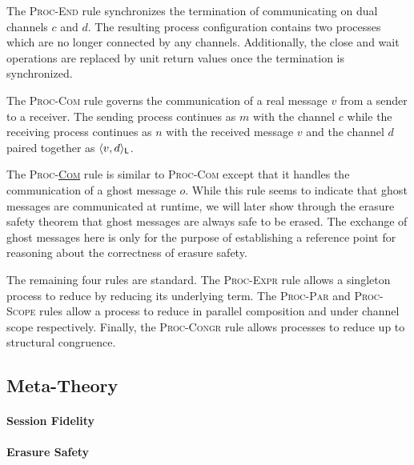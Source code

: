 The \textsc{Proc-End} rule synchronizes the termination of communicating on dual 
channels $c$ and $d$. The resulting process configuration contains two processes
which are no longer connected by any channels. Additionally, the close and wait 
operations are replaced by unit return values once the termination is synchronized.

The \textsc{Proc-Com} rule governs the communication of a real message $v$ from
a sender to a receiver. The sending process continues as $m$ with the channel
$c$ while the receiving process continues as $n$ with the received
message $v$ and the channel $d$ paired together as $\langle{{v},{d}}\rangle_{\textsf{L}}$.

The \textsc{Proc-\underline{Com}} rule is similar to \textsc{Proc-Com} except
that it handles the communication of a ghost message $o$. While this rule seems
to indicate that ghost messages are communicated at runtime, we will later show
through the erasure safety theorem that ghost messages are always safe to be erased.
The exchange of ghost messages here is only for the purpose of establishing a 
reference point for reasoning about the correctness of erasure safety.

The remaining four rules are standard. The \textsc{Proc-Expr} rule allows a
singleton process to reduce by reducing its underlying term. The \textsc{Proc-Par} and
\textsc{Proc-Scope} rules allow a process to reduce in parallel composition and
under channel scope respectively. Finally, the \textsc{Proc-Congr} rule allows
processes to reduce up to structural congruence.


\subsection{Meta-Theory}
\paragraph{\textbf{Session Fidelity}}
\paragraph{\textbf{Erasure Safety}}